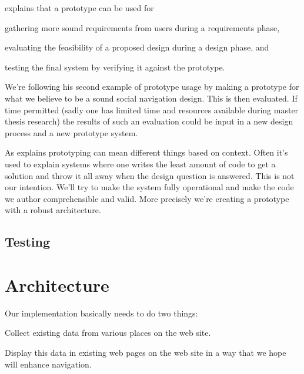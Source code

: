 \citet[pp.~409--410]{sommerville07} explains that a prototype can be used for
\begin{inparaenum}[(i)]
  \item gathering more sound requirements from users during a
    requirements phase,
  \item evaluating the feasibility of a proposed design during a
    design phase, and
  \item testing the final system by verifying it against the prototype.
\end{inparaenum}
We're following his second example of prototype usage by making a prototype
for what we believe to be a sound social navigation design. This is then
evaluated. If time permitted (sadly one has limited time and resources
available during master thesis research) the results of such an evaluation
could be input in a new design process and a new prototype system.

As \citet[p.~114]{mcconnell04} explains prototyping can mean different things
based on context. Often it's used to explain systems where one writes the
least amount of code to get a solution and throw it all away when the design
question is answered. This is not our intention. We'll try to make the system
fully operational and make the code we author comprehensible and
valid. More precisely we're creating a  prototype
\cite[p.~78]{rudd96} with a robust architecture.

\subsection{Testing}


\section{Architecture}

Our implementation basically needs to do two things:

\begin{enum}
  \item Collect existing data from various places on the \urort{} web site.
  \item Display this data in existing web pages on the \urort{} web site in
    a way that we hope will enhance navigation.
\end{enum}

